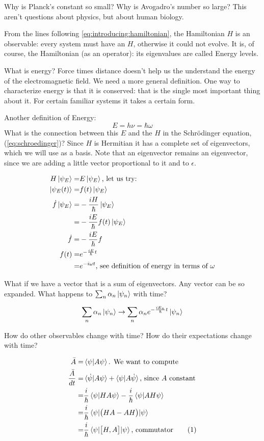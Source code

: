 \documentclass[]{article}
\newcommand\numberthis{\addtocounter{equation}{1}\tag{\theequation}}
\begin{document}
Why is Planck's constant so small? Why is Avogadro's number so large? This aren't questions about physics, but about human biology.

From the lines following \eqref{eq:introducing:hamiltonian}, the Hamiltonian $H$ is an observable: every system must have an $H$, otherwise it could not evolve. It is, of course, the Hamiltonian (as an operator): its eigenvalues are called Energy levels.

What is energy? Force times distance doesn't help us the understand the energy of the electromagnetic field.  We need a more general definition. One way to characterize energy is that it is conserved: that is the single most important thing about it. For certain familiar systems it takes a certain form.

Another definition of Energy:
$$E = h\nu = \hbar \omega$$
What is the connection between this $E$ and the $H$ in the Schr\"odinger equation, (\ref{eq:schroedinger})? Since $H$ is Hermitian it has a complete set of eigenvectors, which we will use as a basis. Note that an eigenvector remains an eigenvector, since we are adding a little vector proportional to it and to $\epsilon$.

\begin{align*}
	H\ket{\psi_E} =& E\ket{\psi_E}\text{, let us try:}\\
	\ket{\psi_E(t)} =& f(t)\ket{\psi_E}\\
	\dot{f}\ket{\psi_E} =& -\frac{iH}{\hbar}\ket{\psi_E}\\
	=& -\frac{iE}{\hbar} f(t) \ket{\psi_E}\\
	\dot{f}=& -\frac{iE}{\hbar} f\\
	f(t) =& e^{-\frac{iE}{\hbar}t}\\
	=& e^{-i \omega t} \text{, see definition of energy in terms of $\omega$}
\end{align*}

What if we have a vector that is a sum of eigenvectors. Any vector can be so expanded. What happens to $\sum_n \alpha_n \ket{\psi_n}$ with time?

\begin{align*}
	\sum_n \alpha_n \ket{\psi_n} \rightarrow \sum_n \alpha_n e^{-\frac{iE_n}{\hbar}t} \ket{\psi_n}
\end{align*}

How do other observables change with time? How do their expectations change with time?

\begin{align*}
	\bar{A} =&\braket{\psi\vert A \psi}\text{. We want to compute}\\
	\frac{\bar{A}}{dt} =&	\braket{\dot{\psi}\vert A \psi} + \braket{\psi\vert A \dot{\psi}} \text{, since $A$ constant}\\
	=& \frac{i}{\hbar}\braket{\psi\vert H A \psi} - \frac{i}{\hbar}\braket{\psi\vert A H \psi}\\
	=& \frac{i}{\hbar} \braket{\psi \vert \big(HA-AH\big)\vert \psi}\\
	=& \frac{i}{\hbar} \braket{\psi \vert \big[H,A\big]\vert \psi} \text {, commutator} \numberthis \label{eq:evolve:state}
\end{align*}
\end{document}
